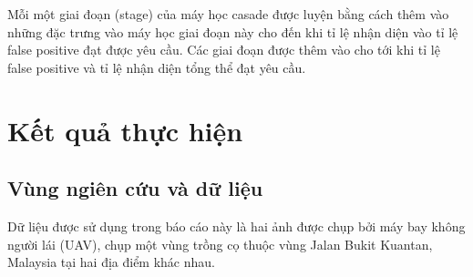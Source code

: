 \documentclass[14pt, oneside, a4paper, openany]{scrartcl}
\begin{document}
Mỗi một giai đoạn (stage) của máy học casade được luyện bằng cách thêm vào những đặc trưng vào máy học giai đoạn này cho đến khi tỉ lệ nhận diện vào tỉ lệ false positive đạt được yêu cầu. Các giai đoạn được thêm vào cho tới khi tỉ lệ false positive và tỉ lệ nhận diện tổng thể đạt yêu cầu.

\newpage
\section{Kết quả thực hiện}
\subsection{Vùng ngiên cứu và dữ liệu}
Dữ liệu được sử dụng trong báo cáo này là hai ảnh được chụp bởi máy bay không người lái (UAV), chụp một vùng trồng cọ thuộc vùng Jalan Bukit Kuantan, Malaysia tại hai địa điểm khác nhau.
\end{document}
